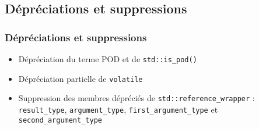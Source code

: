 \documentclass[C++.tex]{subfiles}
\begin{document}
\subsection*{Dépréciations et suppressions}
\begin{frame}[fragile]
	\frametitle{Dépréciations et suppressions}
	\begin{itemize}
		\item Dépréciation du terme POD et de \lstinline|std::is_pod()|
		\item Dépréciation partielle de \lstinline|volatile|


		\item Suppression des membres dépréciés de \lstinline|std::reference_wrapper| : \lstinline|result_type|, \lstinline|argument_type|, \lstinline|first_argument_type| et \lstinline|second_argument_type|
	\end{itemize}
\end{frame}
\end{document}
